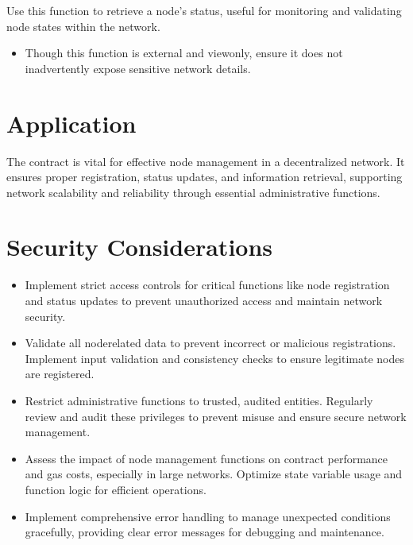\documentclass[a4paper,10pt,english]{sphinxmanual}
\begin{document}
\sphinxAtStartPar
{}

\sphinxAtStartPar
Use this function to retrieve a node’s status, useful for monitoring and validating node states within the network.

\sphinxAtStartPar
{}
\begin{itemize}
\item {} 
\sphinxAtStartPar
{} Though this function is external and view\sphinxhyphen{}only, ensure it does not inadvertently expose sensitive network details.

\end{itemize}


\section{Application}
\label{\detokenize{docs_node_manager_contract:application}}
\sphinxAtStartPar
The  contract is vital for effective node management in a decentralized network. It ensures proper registration, status updates, and information retrieval, supporting network scalability and reliability through essential administrative functions.


\section{Security Considerations}
\label{\detokenize{docs_node_manager_contract:security-considerations}}\begin{itemize}
\item {} 
\sphinxAtStartPar
{} Implement strict access controls for critical functions like node registration and status updates to prevent unauthorized access and maintain network security.

\item {} 
\sphinxAtStartPar
{} Validate all node\sphinxhyphen{}related data to prevent incorrect or malicious registrations. Implement input validation and consistency checks to ensure legitimate nodes are registered.

\item {} 
\sphinxAtStartPar
{} Restrict administrative functions to trusted, audited entities. Regularly review and audit these privileges to prevent misuse and ensure secure network management.

\item {} 
\sphinxAtStartPar
{} Assess the impact of node management functions on contract performance and gas costs, especially in large networks. Optimize state variable usage and function logic for efficient operations.

\item {} 
\sphinxAtStartPar
{} Implement comprehensive error handling to manage unexpected conditions gracefully, providing clear error messages for debugging and maintenance.

\end{itemize}
\end{document}

